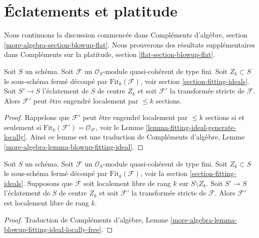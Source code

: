 \section{Éclatements et platitude}
\label{section-blowup-flat}

\noindent
Nous continuons la discussion commencée dans Compléments d'algèbre, section
 \ref{more-algebra-section-blowup-flat}. Nous prouverons des résultats supplémentaires dans Compléments sur la
platitude, section  \ref{flat-section-blowup-flat}.


\begin{lemma}
\label{lemma-strict-transform-blowup-fitting-ideal}
Soit  $S$  un schéma. Soit  $\mathcal{F}$  un  $\mathcal{O}_S$-module
quasi-cohérent de type fini. Soit  $Z_k \subset S$  le sous-schéma fermé découpé par
 $\text{Fit}_k(\mathcal{F})$, voir section  \ref{section-fitting-ideals}. Soit  $S' \to S$  l'éclatement de
 $S$  de centre  $Z_k$  et soit  $\mathcal{F}'$  la transformée stricte de
 $\mathcal{F}$. Alors  $\mathcal{F}'$  peut être engendré localement par  $\leq k$ 
sections.
\end{lemma}

\begin{proof}
Rappelons que  $\mathcal{F}'$  peut être engendré localement par  $\leq k$  sections
si et seulement si  $\text{Fit}_k(\mathcal{F}') = \mathcal{O}_{S'}$, voir le Lemme  \ref{lemma-fitting-ideal-generate-locally}. Ainsi ce
lemme est une traduction de Compléments d'algèbre, Lemme  \ref{more-algebra-lemma-blowup-fitting-ideal}.
\end{proof}

\begin{lemma}
\label{lemma-strict-transform-blowup-fitting-ideal-locally-free}
Soit  $S$  un schéma. Soit  $\mathcal{F}$  un  $\mathcal{O}_S$-module
quasi-cohérent de type fini. Soit  $Z_k \subset S$  le sous-schéma fermé découpé par
 $\text{Fit}_k(\mathcal{F})$, voir la section  \ref{section-fitting-ideals}. Supposons que  $\mathcal{F}$  soit
localement libre de rang  $k$  sur  $S \setminus Z_k$. Soit  $S' \to S$ 
l’éclatement de  $S$  de centre  $Z_k$  et soit  $\mathcal{F}'$  la transformée
stricte de  $\mathcal{F}$. Alors  $\mathcal{F}'$  est localement libre de rang
 $k$.
\end{lemma}

\begin{proof}
Traduction de Compléments d'algèbre, Lemme  \ref{more-algebra-lemma-blowup-fitting-ideal-locally-free}.
\end{proof}

